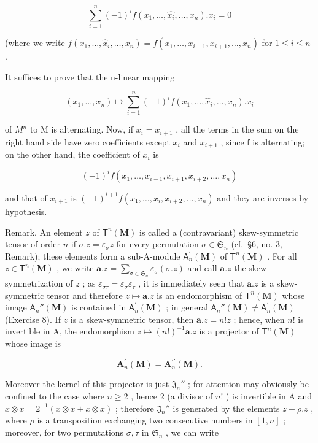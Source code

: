 \[
\sum_ {i = 1} ^ {n} (- 1) ^ {i} f (x _ {1}, \dots , \hat {x _ {i}}, \dots , x _ {n}). x _ {i} = 0\tag{11}
\]

(where we write \(f(x_{1},\ldots ,\hat{x}_{i},\ldots ,x_{n}) = f(x_{1},\ldots ,x_{i - 1},x_{i + 1},\ldots ,x_{n})\) for \(1\leqslant i\leqslant n\) .

It suffices to prove that the n-linear mapping

\[
(x _ {1}, \dots , x _ {n}) \mapsto \sum_ {i = 1} ^ {n} (- 1) ^ {i} f (x _ {1}, \dots , \hat {x} _ {i}, \dots , x _ {n}). x _ {i}
\]

of \(M^{n}\) to M is alternating. Now, if \(x_{i} = x_{i+1}\) , all the terms in the sum on the right hand side have zero coefficients except \(x_{i}\) and \(x_{i+1}\) , since f is alternating; on the other hand, the coefficient of \(x_{i}\) is

\[
(- 1) ^ {i} f (x _ {1}, \dots , x _ {i - 1}, x _ {i + 1}, x _ {i + 2}, \dots , x _ {n})
\]

and that of \(x_{i+1}\) is \((-1)^{i+1}f(x_1, \ldots, x_i, x_{i+2}, \ldots, x_n)\) and they are inverses by hypothesis.

Remark. An element \(z\) of \(\mathsf{T}^n (\mathbf{M})\) is called a (contravariant) skew-symmetric tensor of order \(n\) if \(\sigma .z = \varepsilon_{\sigma}z\) for every permutation \(\sigma \in \mathfrak{S}_n\) (cf.~§6, no. 3, Remark); these elements form a sub-A-module \(\mathsf{A}_n^\prime (\mathbf{M})\) of \(\mathsf{T}^n (\mathbf{M})\) . For all \(z\in \mathsf{T}^n (\mathbf{M})\) , we write \(\pmb {a}.z = \sum_{\sigma \in \mathfrak{S}_n}\varepsilon_\sigma (\sigma .z)\) and call \(\pmb {a}.z\) the skew-symmetrization of \(z\) ; as \(\varepsilon_{\sigma \tau} = \varepsilon_{\sigma}\varepsilon_{\tau}\) , it is immediately seen that \(\pmb {a}.z\) is a skew-symmetric tensor and therefore \(z\mapsto \pmb {a}.z\) is an endomorphism of \(\mathsf{T}^n (\mathbf{M})\) whose image \(\mathsf{A}_n''(\mathbf{M})\) is contained in \(\mathsf{A}_n^\prime (\mathbf{M})\) ; in general \(\mathsf{A}_n''(\mathbf{M})\neq \mathsf{A}_n^\prime (\mathbf{M})\) (Exercise 8). If \(z\) is a skew-symmetric tensor, then \(\pmb {a}.z = n!z\) ; hence, when \(n!\) is invertible in A, the endomorphism \(z\mapsto (n!)^{-1}\pmb {a}.z\) is a projector of \(\mathsf{T}^n (\mathbf{M})\) whose image is

\[
\mathbf {A} _ {n} ^ {\prime} (\mathbf {M}) = \mathbf {A} _ {n} ^ {\prime \prime} (\mathbf {M}).
\]

Moreover the kernel of this projector is just \(\mathfrak{J}_n''\) ; for attention may obviously be confined to the case where \(n \geqslant 2\) , hence 2 (a divisor of \(n!\) ) is invertible in A and \(x \otimes x = 2^{-1}(x \otimes x + x \otimes x)\) ; therefore \(\mathfrak{J}_n''\) is generated by the elements \(z + \rho . z\) , where \(\rho\) is a transposition exchanging two consecutive numbers in \([1, n]\) ; moreover, for two permutations \(\sigma, \tau\) in \(\mathfrak{S}_n\) , we can write


